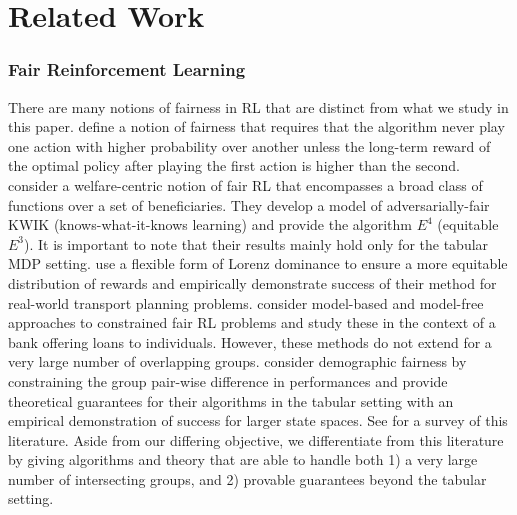 \section{Related Work}
\subsubsection{Fair Reinforcement Learning}
There are many notions of fairness in RL that are distinct from what we study in this paper. \citet{jabbari2017fairness} define a notion of fairness that requires that the algorithm never play one action with higher probability over another unless the long-term reward of the optimal policy after playing the first action is higher than the second. 
\citet{cousinswelfare} consider a welfare-centric notion of fair RL that encompasses a broad class of functions over a set of beneficiaries. They develop a model of adversarially-fair KWIK (knows-what-it-knows learning) and provide the algorithm $E^4$ (equitable $E^3$). It is important to note that their results mainly hold only for the tabular MDP setting.
\citet{michailidis2024scalable} use a flexible form of Lorenz dominance to ensure a more equitable distribution of rewards and empirically demonstrate success of their method for real-world transport planning problems.
\citet{wen2021algorithms} consider model-based and model-free approaches to constrained fair RL problems and study these in the context of a bank offering loans to individuals. However, these methods do not extend for a very large number of overlapping groups.
\citet{satija2023group} consider demographic fairness by constraining the group pair-wise difference in performances and provide theoretical guarantees for their algorithms in the tabular setting with an empirical demonstration of success for larger state spaces.
See \citet{reuel2024fairness} for a survey of this literature. Aside from our differing objective, we differentiate from this literature by giving algorithms and theory that are able to handle both 1) a very large number of intersecting groups, and 2) provable guarantees beyond the tabular setting. 


